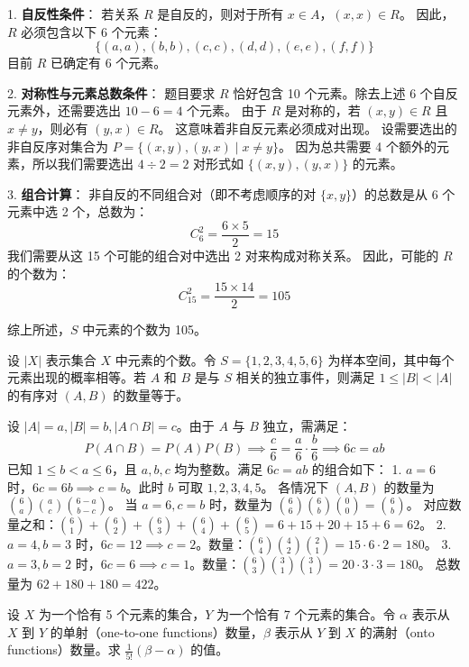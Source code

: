 \begin{questions}
\begin{solution}
1.  \textbf{自反性条件}：
    若关系 $R$ 是自反的，则对于所有 $x \in A$，$(x, x) \in R$。
    因此，$R$ 必须包含以下 6 个元素：
    \[ \{(a, a), (b, b), (c, c), (d, d), (e, e), (f, f)\} \]
    目前 $R$ 已确定有 6 个元素。

2.  \textbf{对称性与元素总数条件}：
    题目要求 $R$ 恰好包含 10 个元素。除去上述 6 个自反元素外，还需要选出 $10 - 6 = 4$ 个元素。
    由于 $R$ 是对称的，若 $(x, y) \in R$ 且 $x \neq y$，则必有 $(y, x) \in R$。
    这意味着非自反元素必须成对出现。
    设需要选出的非自反序对集合为 $P = \{(x, y), (y, x) \mid x \neq y\}$。
    因为总共需要 4 个额外的元素，所以我们需要选出 $4 \div 2 = 2$ 对形式如 $\{(x, y), (y, x)\}$ 的元素。

3.  \textbf{组合计算}：
    非自反的不同组合对（即不考虑顺序的对 $\{x, y\}$）的总数是从 6 个元素中选 2 个，总数为：
    \[ C_6^2 = \frac{6 \times 5}{2} = 15 \]
    我们需要从这 15 个可能的组合对中选出 2 对来构成对称关系。
    因此，可能的 $R$ 的个数为：
    \[ C_{15}^2 = \frac{15 \times 14}{2} = 105 \]

综上所述，$S$ 中元素的个数为 105。
\end{solution}

\question 设 $|X|$ 表示集合 $X$ 中元素的个数。令 $S = \{1, 2, 3, 4, 5, 6\}$ 为样本空间，其中每个元素出现的概率相等。若 $A$ 和 $B$ 是与 $S$ 相关的独立事件，则满足 $1 \le |B| < |A|$ 的有序对 $(A, B)$ 的数量等于\underline{\quad\quad}。

\begin{solution}
设 $|A| = a, |B| = b, |A \cap B| = c$。由于 $A$ 与 $B$ 独立，需满足：
\[
P(A \cap B) = P(A)P(B) \implies \frac{c}{6} = \frac{a}{6} \cdot \frac{b}{6} \implies 6c = ab
\]
已知 $1 \le b < a \le 6$，且 $a, b, c$ 均为整数。满足 $6c = ab$ 的组合如下：
1. $a=6$ 时，$6c=6b \implies c=b$。此时 $b$ 可取 $1, 2, 3, 4, 5$。
各情况下 $(A, B)$ 的数量为 $\binom{6}{a} \binom{a}{c} \binom{6-a}{b-c}$。
当 $a=6, c=b$ 时，数量为 $\binom{6}{6} \binom{6}{b} \binom{0}{0} = \binom{6}{b}$。
对应数量之和：$\binom{6}{1} + \binom{6}{2} + \binom{6}{3} + \binom{6}{4} + \binom{6}{5} = 6 + 15 + 20 + 15 + 6 = 62$。
2. $a=4, b=3$ 时，$6c=12 \implies c=2$。数量：$\binom{6}{4} \binom{4}{2} \binom{2}{1} = 15 \cdot 6 \cdot 2 = 180$。
3. $a=3, b=2$ 时，$6c=6 \implies c=1$。数量：$\binom{6}{3} \binom{3}{1} \binom{3}{1} = 20 \cdot 3 \cdot 3 = 180$。
总数量为 $62 + 180 + 180 = 422$。
\end{solution}

\question 设 $X$ 为一个恰有 5 个元素的集合，$Y$ 为一个恰有 7 个元素的集合。令 $\alpha$ 表示从 $X$ 到 $Y$ 的单射（one-to-one functions）数量，$\beta$ 表示从 $Y$ 到 $X$ 的满射（onto functions）数量。求 $\frac{1}{5!} (\beta - \alpha)$ 的值。


\end{questions}
